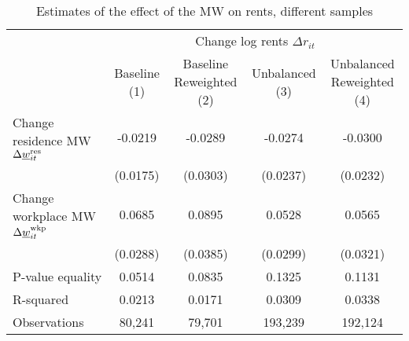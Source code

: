 \begin{landscape}
\begin{table}[hbt!]
    \centering
    \caption{Estimates of the effect of the MW on rents, different samples}
    \label{tab:static_sample}

    \begin{tabular}{@{}lcccc@{}}
        \toprule
                                             & \multicolumn{4}{c}{Change log rents $\Delta r_{it}$}                   \\ \cmidrule(l){2-5} 
                                             & \shortstack{Baseline\\(1)}       & \shortstack{Baseline\\Reweighted (2)}
                                             & \shortstack{Unbalanced\\(3)}     & \shortstack{Unbalanced\\Reweighted (4)}  \\ \midrule
        Change residence MW 
                  $\Delta\underline{w}_{it}^{\text{res}}$    & -0.0219      & -0.0289        & -0.0274       & -0.0300     \\
                                             & (0.0175)    & (0.0303)      & (0.0237)     & (0.0232)   \\
        Change workplace MW 
                   $\Delta\underline{w}_{it}^{\text{wkp}}$   & 0.0685      & 0.0895        & 0.0528       & 0.0565     \\
                                             & (0.0288)    & (0.0385)      & (0.0299)     & (0.0321)   \\ \midrule
        P-value equality                     & 0.0514      & 0.0835        & 0.1325       & 0.1131     \\
        R-squared                            & 0.0213      & 0.0171        & 0.0309       & 0.0338    \\
        Observations                         & 80,241     & 79,701       & 193,239      & 192,124   \\ \bottomrule
    \end{tabular}


\end{table}
\end{landscape}
